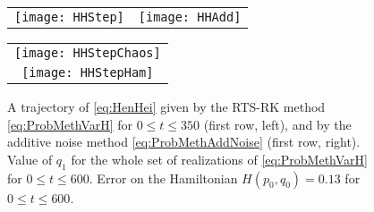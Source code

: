 \documentclass{siamart1116}
\numberwithin{theorem}{section}
\begin{document}
\begin{figure}[t!]
	\begin{center}
		\begin{tabular}{cc}
			\texttt{[image: HHStep]} & \texttt{[image: HHAdd]} \\
		\end{tabular}
		\begin{tabular}{c}
			\texttt{[image: HHStepChaos]} \\
			\texttt{[image: HHStepHam]}
		\end{tabular}
	\end{center}
	\caption{A trajectory of \eqref{eq:HenHei} given by the RTS-RK method \eqref{eq:ProbMethVarH} for $0 \leq t \leq 350$ (first row, left), and by the additive noise method \eqref{eq:ProbMethAddNoise} (first row, right). Value of $q_1$ for the whole set of realizations of \eqref{eq:ProbMethVarH} for $0 \leq t \leq 600$. Error on the Hamiltonian $H(p_0, q_0) = 0.13$ for $0 \leq t \leq 600$.}
	\label{fig:HH}
\end{figure}
\end{document}
